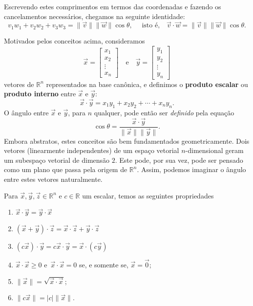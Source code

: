 \noindent Escrevendo estes comprimentos em termos das coordenadas e fazendo os cancelamentos necessários, chegamos na seguinte identidade:
\begin{equation}
v_1 w_1 + v_2 w_2 + v_3 w_3 = \|\vec{v}\| \|\vec{w}\| \cos \theta, \quad \text{ isto é,} \quad \vec{v} \cdot \vec{w} = \|\vec{v}\| \|\vec{w}\| \cos \theta.
\end{equation}


Motivados pelos conceitos acima, consideramos
\begin{equation}
\vec{x} =
\begin{bmatrix}
x_1 \\ x_2 \\ \vdots \\ x_n
\end{bmatrix} \quad \text{e} \quad \vec{y} =
\begin{bmatrix}
y_1 \\ y_2 \\ \vdots \\ y_n
\end{bmatrix}
\end{equation} vetores de $\mathbb{R}^n$ representados na base canônica, e definimos o \textbf{produto escalar} ou \textbf{produto interno} entre $\vec{x}$ e $\vec{y}$:
\begin{equation}
\vec{x} \cdot \vec{y} = x_1 y_1 + x_2 y_2 + \cdots + x_n y_n.
\end{equation} O ângulo entre $\vec{x}$ e $\vec{y}$, para $n$ qualquer, pode então ser \textit{definido} pela equação
\begin{equation}
\cos \theta = \frac{\vec{x} \cdot \vec{y}}{\|\vec{x}\| \|\vec{y}\|}.
\end{equation} Embora abstratos, estes conceitos são bem fundamentados geometricamente. Dois vetores (linearmente independentes) de um espaço vetorial $n$-dimensional geram um subespaço vetorial de dimensão $2$. Este pode, por sua vez, pode ser pensado como um plano que passa pela origem de $\mathbb{R}^n$. Assim, podemos imaginar o ângulo entre estes vetores naturalmente.

\begin{prop}
	Para $\vec{x}, \vec{y}, \vec{z} \in \mathbb{R}^n$ e $c \in \mathbb{R}$ um escalar, temos as seguintes propriedades
	\begin{enumerate}
		\item  $\vec{x} \cdot \vec{y} = \vec{y} \cdot \vec{x}$
		\item  $(\vec{x} + \vec{y}) \cdot \vec{z} = \vec{x} \cdot \vec{z} + \vec{y} \cdot \vec{z}$
		\item  $(c\vec{x}) \cdot \vec{y} = c \vec{x} \cdot \vec{y} = \vec{x} \cdot (c\vec{y})$
		\item  $\vec{x} \cdot \vec{x} \ge 0$ e $\, \vec{x} \cdot \vec{x} = 0$ se, e somente se, $\vec{x} = \vec{0}$;
		\item  $\|\vec{x}\| = \sqrt{\vec{x} \cdot \vec{x}}$;
		\item  $\| c \vec{x} \| =  |c| \| \vec{x} \|$.
	\end{enumerate}
\end{prop}

